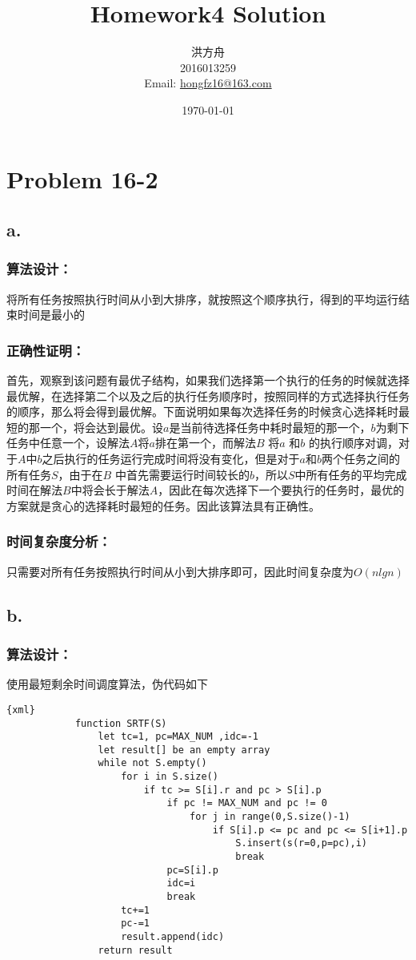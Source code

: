 \documentclass{article}
\title{Homework4 Solution}
\author{洪方舟\\2016013259\\Email: \href{mailto:hongfz16@163.com}{hongfz16@163.com}}
\date{\today}
\begin{document}
  \maketitle
  \setlength\parindent{0em}
  \section*{Problem 16-2}
    \subsection*{a.}
        \subsubsection*{算法设计：}
            将所有任务按照执行时间从小到大排序，就按照这个顺序执行，得到的平均运行结束时间是最小的
        \subsubsection*{正确性证明：}
            首先，观察到该问题有最优子结构，如果我们选择第一个执行的任务的时候就选择最优解，在选择第二个以及之后的执行任务顺序时，按照同样的方式选择执行任务的顺序，那么将会得到最优解。下面说明如果每次选择任务的时候贪心选择耗时最短的那一个，将会达到最优。设$a$是当前待选择任务中耗时最短的那一个，$b$为剩下任务中任意一个，设解法$A$将$a$排在第一个，而解法$B$ 将$a$ 和$b$ 的执行顺序对调，对于$A$中$b$之后执行的任务运行完成时间将没有变化，但是对于$a$和$b$两个任务之间的所有任务$S$，由于在$B$ 中首先需要运行时间较长的$b$，所以$S$中所有任务的平均完成时间在解法$B$中将会长于解法$A$，因此在每次选择下一个要执行的任务时，最优的方案就是贪心的选择耗时最短的任务。因此该算法具有正确性。
        \subsubsection*{时间复杂度分析：}
            只需要对所有任务按照执行时间从小到大排序即可，因此时间复杂度为$O(nlgn)$
    \subsection*{b.}
        \subsubsection*{算法设计：}
            使用最短剩余时间调度算法，伪代码如下
            \begin{lstlisting}{xml}
            function SRTF(S)
                let tc=1, pc=MAX_NUM ,idc=-1
                let result[] be an empty array
                while not S.empty()
                    for i in S.size()
                        if tc >= S[i].r and pc > S[i].p
                            if pc != MAX_NUM and pc != 0
                                for j in range(0,S.size()-1)
                                    if S[i].p <= pc and pc <= S[i+1].p
                                        S.insert(s(r=0,p=pc),i)
                                        break
                            pc=S[i].p
                            idc=i
                            break
                    tc+=1
                    pc-=1
                    result.append(idc)
                return result
            \end{lstlisting}
\end{document}
